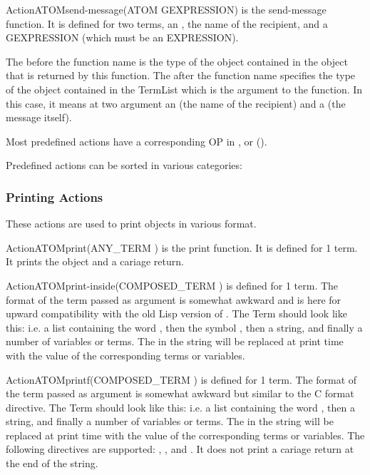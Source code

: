 \begin{typeefa}{Action}{ATOM}{send-message}{(ATOM GEXPRESSION)}
is the send-message function. It is defined for two terms, an , the
name of the recipient, and a GEXPRESSION (which must be an EXPRESSION).
\end{typeefa}

The  before the function name  is the type of the
object contained in the  object that is returned by this
 function.  The  after the function
name specifies the type of the object contained in the TermList which is the
argument to the  function. In this case, it means at two
argument an  (the name of the recipient) and a 
(the message itself).

Most predefined actions have a corresponding OP in ,
 or  ().

Predefined actions can be sorted in various categories:



\subsubsection{Printing Actions}

These actions are used to print objects in various format.

\begin{typeefa}{Action}{ATOM}{print}{(ANY\_TERM )} is the print
function. It is defined for 1 term. It prints the object and a cariage return.
\end{typeefa}

\begin{typeefa}{Action}{ATOM}{print-inside}{(COMPOSED\_TERM )}
is defined for 1 term. The format of the term passed as argument is somewhat
awkward and is here for upward compatibility with the old Lisp version of
\OPRS{}. The Term should look like this: \*
\*
i.e. a list containing the word , then the symbol
, then a string, and finally a number of variables or terms.
The  in the string will be replaced at print time with the value of
the corresponding terms or variables.
\end{typeefa}

\begin{typeefa}{Action}{ATOM}{printf}{(COMPOSED\_TERM )}
is defined for 1 term. The format of the term passed as argument is somewhat
awkward but similar to the C format directive. 
The Term should look like this: \*
\*
i.e. a list containing the word , then a string, and finally a
number of variables or terms.  The  in the string will be replaced at
print time with the value of the corresponding terms or variables. The
following directives are supported: , ,  and
. It does not print a cariage return at the end of the string.
\end{typeefa}

